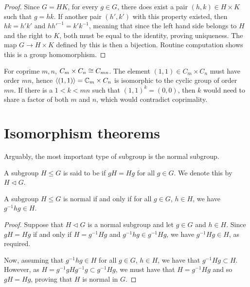 \begin{proof}
  Since \(G = HK\), for every \(g \in G\), there does exist a pair \((h,k) \in H \times K\) such that \(g = hk\). If another pair \((h',k')\) with this property existed, then \(hk = h'k'\) and \(hh'^{-1} = k'k^{-1}\), meaning that since the left hand side belongs to \(H\) and the right to \(K\), both must be equal to the identity, proving uniqueness. The map \(G \to H \times K\) defined by this is then a bijection. Routine computation shows this is a group homomorphism.
\end{proof}

\begin{example}
  For coprime \(m, n\), \(C_{m} \times C_{n} \cong C_{mn}\).
  The element \((1,1) \in C_{m} \times C_{n}\) must have order \(mn\), hence \(\langle (1,1)\rangle= \mathbb{C}_{m} \times C_{n}\) is isomorphic to the cyclic group of order \(mn\).
  If there is a \(1 < k < mn\) such that \((1,1)^{k} = (0,0)\), then \(k\) would need to share a factor of both \(m\) and \(n\), which would contradict coprimality.
\end{example}



\section{Isomorphism theorems}
\label{sec:group-theory:isomorphism-theorems}

Arguably, the most important type of subgroup is the normal subgroup.

\begin{definition}\label{def:group-theory:normal-subgroup}
  A subgroup \(H \leq G\) is said to be  if \(gH = Hg\) for all \(g \in G\).
  We denote this by \(H \triangleleft G\).
\end{definition}

\begin{lemma}\label{lem:group-theory:normal-subgroup-criterion}
  A subgroup \(H \leq G\) is normal if and only if for all \(g \in G\), \(h \in H\), we have \(g^{-1}hg \in H\).
\end{lemma}

\begin{proof}
  Suppose that \(H \triangleleft G\) is a normal subgroup and let \(g \in G\) and \(h \in H\).
  Since \(gH = Hg\) if and only if \(H = g^{-1}Hg\) and \(g^{-1}hg \in  g^{-1}Hg\), we have \(g^{-1}Hg \in H\), as required.

  Now, assuming that \(g^{-1}hg \in H\) for all \(g \in G\), \(h \in H\), we have that \(g^{-1} H g \subset H\). However, as \(H = g^{-1}gHg^{-1}g \subset g^{-1}Hg\), we must have that \(H = g^{-1}Hg\) and so \(gH = Hg\), proving that \(H\) is normal in \(G\).
\end{proof}

